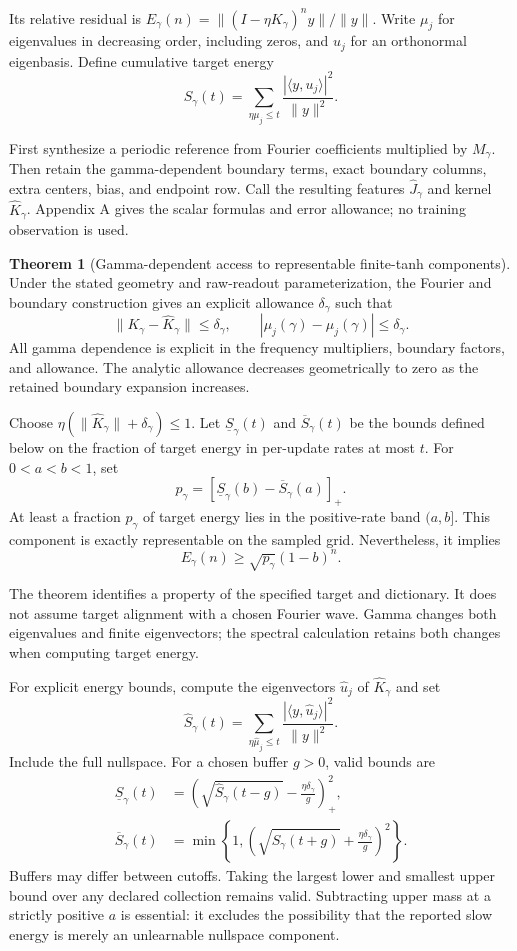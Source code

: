 \documentclass[11pt]{article}
\theoremstyle{definition}
\newtheorem{theorem}{Theorem}
\begin{document}
Its relative residual is
$E_\gamma(n)=\|(I-\eta K_\gamma)^ny\|/\|y\|$.
Write $\mu_j$ for eigenvalues in decreasing order, including zeros, and
$u_j$ for an orthonormal eigenbasis. Define cumulative target energy
\[
S_\gamma(t)=\sum_{\eta\mu_j\le t}
\frac{|\langle y,u_j\rangle|^2}{\|y\|^2}.
\]

First synthesize a periodic reference from Fourier coefficients multiplied
by $M_\gamma$. Then retain the gamma-dependent boundary terms, exact boundary
columns, extra centers, bias, and endpoint row. Call the resulting features
$\widehat J_\gamma$ and kernel $\widehat K_\gamma$. Appendix A gives the
scalar formulas and error allowance; no training observation is used.

\begin{theorem}[Gamma-dependent access to representable finite-tanh components]
Under the stated geometry and raw-readout parameterization, the Fourier and
boundary construction gives an explicit allowance $\delta_\gamma$ such that
\[
\|K_\gamma-\widehat K_\gamma\|\le\delta_\gamma,\qquad
|\mu_j(\gamma)-\widehat\mu_j(\gamma)|\le\delta_\gamma.
\]
All gamma dependence is explicit in the frequency multipliers, boundary
factors, and allowance. The analytic allowance decreases geometrically to
zero as the retained boundary expansion increases.

Choose $\eta(\|\widehat K_\gamma\|+\delta_\gamma)\le1$. Let
$\underline S_\gamma(t)$ and $\overline S_\gamma(t)$ be the bounds defined
below on the fraction of target energy in per-update rates at most $t$.
For $0<a<b<1$, set
\[
p_\gamma=\left[\underline S_\gamma(b)-\overline S_\gamma(a)\right]_+.
\]
At least a fraction $p_\gamma$ of target energy lies in the positive-rate
band $(a,b]$. This component is exactly representable on the sampled grid.
Nevertheless, it implies
\[
\boxed{E_\gamma(n)\ge\sqrt{p_\gamma}(1-b)^n.}
\]
\end{theorem}
The theorem identifies a property of the specified target and dictionary.
It does not assume target alignment with a chosen Fourier wave. Gamma changes
both eigenvalues and finite eigenvectors; the spectral calculation retains
both changes when computing target energy.

For explicit energy bounds, compute the eigenvectors $\widehat u_j$ of
$\widehat K_\gamma$ and set
\[
\widehat S_\gamma(t)=\sum_{\eta\widehat\mu_j\le t}
\frac{|\langle y,\widehat u_j\rangle|^2}{\|y\|^2}.
\]
Include the full nullspace. For a chosen buffer $g>0$, valid bounds are
\begin{align*}
\underline S_\gamma(t)
&=\left(\sqrt{\widehat S_\gamma(t-g)}-
\frac{\eta\delta_\gamma}{g}\right)_+^2,\\
\overline S_\gamma(t)
&=\min\!\left\{1,\left(\sqrt{\widehat S_\gamma(t+g)}+
\frac{\eta\delta_\gamma}{g}\right)^2\right\}.
\end{align*}
Buffers may differ between cutoffs. Taking the largest lower and smallest
upper bound over any declared collection remains valid. Subtracting upper
mass at a strictly positive $a$ is essential: it excludes the possibility
that the reported slow energy is merely an unlearnable nullspace component.
\end{document}
